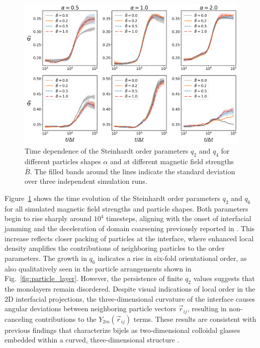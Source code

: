 \begin{figure}
\includegraphics[width=\textwidth]{../figures/results/paper1_5/steinhardt_time.png}%
\caption{Time dependence of the Steinhardt order parameters $q_2$ and $q_4$ for different particles shapes $\alpha$ and at different magnetic field strengths $\bar{B}$. The filled bands around the lines indicate the standard deviation over three independent simulation runs.}
\label{fig:steinhardt_time}%
\end{figure}

Figure~\ref{fig:steinhardt_time} shows the time evolution of the Steinhardt order parameters \(q_2\) and \(q_6\) for all simulated magnetic field strengths and particle shapes. Both parameters begin 
to rise sharply around \(10^4\) timesteps, aligning with the onset of interfacial jamming and the deceleration of domain coarsening previously reported in \cite{karthikeyan_formation_2024}. This increase 
reflects closer packing of particles at the interface, where enhanced local density amplifies the contributions of neighboring particles to the order parameters. The growth in \(q_6\) indicates a 
rise in six-fold orientational order, as also qualitatively seen in the particle arrangements shown in Fig.~\ref{fig:particle_layer}. However, the persistence of finite \(q_2\) values suggests that the 
monolayers remain disordered. Despite visual indications of local order in the 2D interfacial projections, the three-dimensional curvature of the interface causes angular deviations between neighboring 
particle vectors \(\vec{r}_{ij}\), resulting in non-canceling contributions to the \(Y_{2m}(\vec{r}_{ij})\) terms. These results are consistent with previous findings that characterize bijels as two-dimensional 
colloidal glasses embedded within a curved, three-dimensional structure \cite{ching_bijel_2022}.

